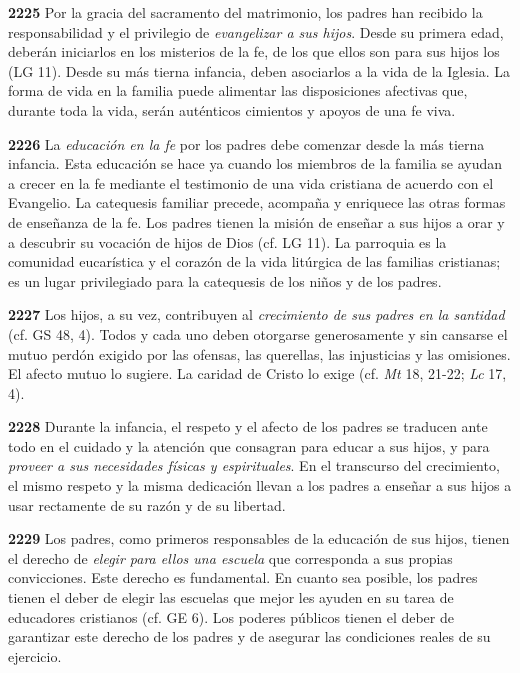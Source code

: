 \textbf{2225} Por la gracia del sacramento del matrimonio, los padres han recibido la responsabilidad y el privilegio de \emph{evangelizar a sus hijos}. Desde su primera edad, deberán iniciarlos en los misterios de la fe, de los que ellos son para sus hijos los  (LG 11). Desde su más tierna infancia, deben asociarlos a la vida de la Iglesia. La forma de vida en la familia puede alimentar las disposiciones afectivas que, durante toda la vida, serán auténticos cimientos y apoyos de una fe viva.

\textbf{2226} La \emph{educación en la fe} por los padres debe comenzar desde la más tierna infancia. Esta educación se hace ya cuando los miembros de la familia se ayudan a crecer en la fe mediante el testimonio de una vida cristiana de acuerdo con el Evangelio. La catequesis familiar precede, acompaña y enriquece las otras formas de enseñanza de la fe. Los padres tienen la misión de enseñar a sus hijos a orar y a descubrir su vocación de hijos de Dios (cf. LG 11). La parroquia es la comunidad eucarística y el corazón de la vida litúrgica de las familias cristianas; es un lugar privilegiado para la catequesis de los niños y de los padres.

\textbf{2227} Los hijos, a su vez, contribuyen al \emph{crecimiento de sus padres en la santidad} (cf. GS 48, 4). Todos y cada uno deben otorgarse generosamente y sin cansarse el mutuo perdón exigido por las ofensas, las querellas, las injusticias y las omisiones. El afecto mutuo lo sugiere. La caridad de Cristo lo exige (cf. \emph{Mt} 18, 21-22; \emph{Lc} 17, 4).

\textbf{2228} Durante la infancia, el respeto y el afecto de los padres se traducen ante todo en el cuidado y la atención que consagran para educar a sus hijos, y para \emph{proveer a sus necesidades físicas y espirituales}. En el transcurso del crecimiento, el mismo respeto y la misma dedicación llevan a los padres a enseñar a sus hijos a usar rectamente de su razón y de su libertad.

\textbf{2229} Los padres, como primeros responsables de la educación de sus hijos, tienen el derecho de \emph{elegir para ellos una escuela} que corresponda a sus propias convicciones. Este derecho es fundamental. En cuanto sea posible, los padres tienen el deber de elegir las escuelas que mejor les ayuden en su tarea de educadores cristianos (cf. GE 6). Los poderes públicos tienen el deber de garantizar este derecho de los padres y de asegurar las condiciones reales de su ejercicio.

